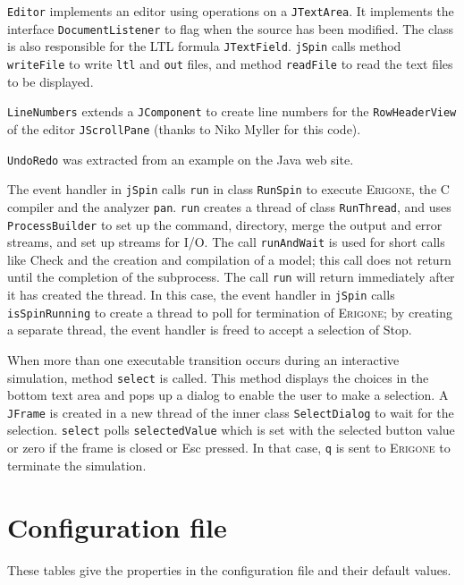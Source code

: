 \documentclass[11pt]{article}
\newcommand{\eri}{\textsc{Erigone}}
\newcommand{\p}[1]{\texttt{#1}}
\newcommand{\bu}[1]{\textsf{#1}}
\begin{document}
\p{Editor} implements an editor using operations on a
\p{JTextArea}. It implements the interface \p{Document\-Listener} to flag
when the source has been modified. The class is also responsible
for the LTL formula \p{JTextField}. \p{jSpin} calls method \p{writeFile}
to write \p{ltl} and \p{out} files, and method \p{readFile} to read
the text files to be displayed.

\p{LineNumbers} extends a \p{JComponent} to create line numbers
for the \p{RowHeaderView} of the editor \p{JScrollPane}
(thanks to Niko Myller for this code).

\p{UndoRedo} was extracted from an example on the Java web site.

The event handler in \p{jSpin} calls \p{run} in class \p{RunSpin}
to execute \eri{}, the C compiler and the analyzer \p{pan}.
\p{run} creates a thread of class \p{RunThread},
and uses \p{ProcessBuilder} to set up the
command, directory, merge the output and error streams,
and set up streams for I/O.
The call \p{runAndWait} is used for short calls like \bu{Check}
and the creation and compilation of a model;
this call does not return until the completion of the subprocess.
The call \p{run} will return immediately after it has created the thread.
In this case, the event handler in \p{jSpin} calls \p{isSpinRunning}
to create a thread to poll for termination of \eri{};
by creating a separate thread, the event handler is freed to accept
a selection of \bu{Stop}.

When more than one executable transition occurs during an interactive
simulation, method \p{select} is called. This method displays the
choices in the bottom text area and pops up a dialog to enable the user
to make a selection. A \p{JFrame} is created in a new thread of the
inner class \p{SelectDialog} to wait for the selection. \p{select} polls
\p{selectedValue} which is set with the selected button value or zero if
the frame is closed or \bu{Esc} pressed. In that case, \p{q} is sent to
\eri{} to terminate the simulation.

\newpage

\appendix

\section{Configuration file}\label{a.cfg}

These tables give the properties in the configuration file and their
default values.
\end{document}
